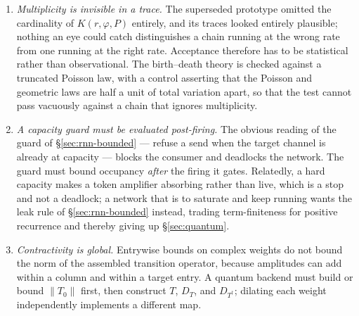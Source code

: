 \documentclass[11pt,a4paper]{article}
\theoremstyle{plain}
\theoremstyle{definition}
\theoremstyle{remark}
\begin{document}
\begin{enumerate}[leftmargin=2.2em]
\item \emph{Multiplicity is invisible in a trace.} The superseded prototype omitted the cardinality
of $K(r,\varphi,P)$ entirely, and its traces looked entirely plausible; nothing an eye could catch
distinguishes a chain running at the wrong rate from one running at the right rate. Acceptance
therefore has to be statistical rather than observational. The birth--death theory is checked against
a truncated Poisson law, with a control asserting that the Poisson and geometric laws are half a unit
of total variation apart, so that the test cannot pass vacuously against a chain that ignores
multiplicity.
\item \emph{A capacity guard must be evaluated post-firing.} The obvious reading of the guard of
\S\ref{sec:rnn-bounded} --- refuse a send when the target channel is already at capacity --- blocks
the consumer and deadlocks the network. The guard must bound occupancy \emph{after} the firing it
gates. Relatedly, a hard capacity makes a token amplifier absorbing rather than live, which is a stop
and not a deadlock; a network that is to saturate and keep running wants the leak rule of
\S\ref{sec:rnn-bounded} instead, trading term-finiteness for positive recurrence and thereby giving
up \S\ref{sec:quantum}.
\item \emph{Contractivity is global.} Entrywise bounds on complex weights do not bound the norm of
the assembled transition operator, because amplitudes can add within a column and within a target
entry. A quantum backend must build or bound $\|T_0\|$ first, then construct $T$, $D_T$, and
$D_{T^\dagger}$; dilating each weight independently implements a different map.
\end{enumerate}
\end{document}
